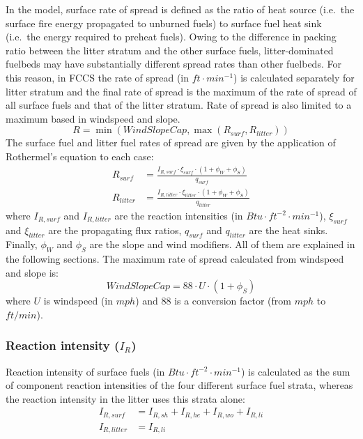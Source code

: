 \documentclass[]{book}
\begin{document}
In the \citet{Rothermel1972} model, surface rate of spread is defined as the ratio of heat source (i.e.~the surface fire energy propagated to unburned fuels) to surface fuel heat sink (i.e.~the energy required to preheat fuels). Owing to the difference in packing ratio between the litter stratum and the other surface fuels, litter-dominated fuelbeds may have substantially different spread rates than other fuelbeds. For this reason, in FCCS the rate of spread (in \(ft \cdot min^{-1}\)) is calculated separately for litter stratum and the final rate of spread is the maximum of the rate of spread of all surface fuels and that of the litter stratum. Rate of spread is also limited to a maximum based in windspeed and slope.
\begin{equation}
R = \min(WindSlopeCap, \max(R_{surf}, R_{litter}))
\end{equation}
The surface fuel and litter fuel rates of spread are given by the application of Rothermel's \citeyearpar{Rothermel1972} equation to each case:
\begin{eqnarray} 
R_{surf} &= \frac{I_{R,surf} \cdot \xi_{surf}\cdot (1 + \phi_W + \phi_S)}{q_{surf}}\\
R_{litter} &= \frac{I_{R,litter} \cdot \xi_{litter}\cdot (1 + \phi_W + \phi_S)}{q_{litter}}
\end{eqnarray}
where \(I_{R,surf}\) and \(I_{R,litter}\) are the reaction intensities (in \(Btu \cdot ft^{-2} \cdot min^{-1}\)), \(\xi_{surf}\) and \(\xi_{litter}\) are the propagating flux ratios, \(q_{surf}\) and \(q_{litter}\) are the heat sinks. Finally, \(\phi_W\) and \(\phi_S\) are the slope and wind modifiers. All of them are explained in the following sections. The maximum rate of spread calculated from windspeed and slope is:
\begin{equation}
WindSlopeCap = 88 \cdot U \cdot (1 + \phi_S)
\end{equation}
where \(U\) is windspeed (in \(mph\)) and \(88\) is a conversion factor (from \(mph\) to \(ft/min\)).

\hypertarget{reaction-intensity-i_r}{%
\subsubsection{\texorpdfstring{Reaction intensity (\(I_R\))}{Reaction intensity (I\_R)}}\label{reaction-intensity-i_r}}

Reaction intensity of surface fuels (in \(Btu \cdot ft^{-2} \cdot min^{-1}\)) is calculated as the sum of component reaction intensities of the four different surface fuel strata, whereas the reaction intensity in the litter uses this strata alone:
\begin{eqnarray} 
I_{R,surf} &= I_{R, sh} + I_{R, he}+ I_{R, wo}+I_{R, li}\\
I_{R,litter} &= I_{R, li}
\label{eq:reactintensity}
\end{eqnarray}
\end{document}
